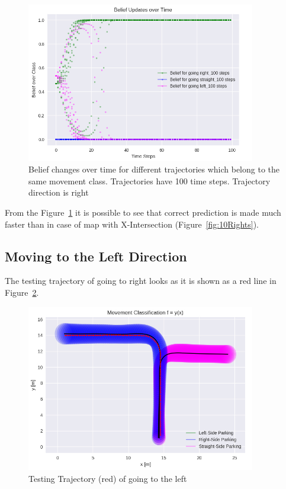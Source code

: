 \begin{figure}[H]
	\centering  	
	\includegraphics[width=10cm]{img/10Rights_T.jpg}
	\caption{Belief changes over time for different trajectories which belong to the same movement class. Trajectories have 100 time steps. Trajectory direction is right}
	\label{fig:10RightsT}    
\end{figure}

From the Figure~\ref{fig:10RightsT} it is possible to see that correct prediction is made much faster than in case of map with X-Intersection (Figure~\ref{fig:10Rights}).

\subsection{Moving to the Left Direction}

The testing trajectory of going to right looks as it is shown as a red line in Figure~\ref{fig:left_T}.

\begin{figure}[H]
	\centering  	
	\includegraphics[width=10cm]{img/left_org_T.jpg}
	\caption{Testing Trajectory (red) of going to the left}
	\label{fig:left_T}    
\end{figure}

